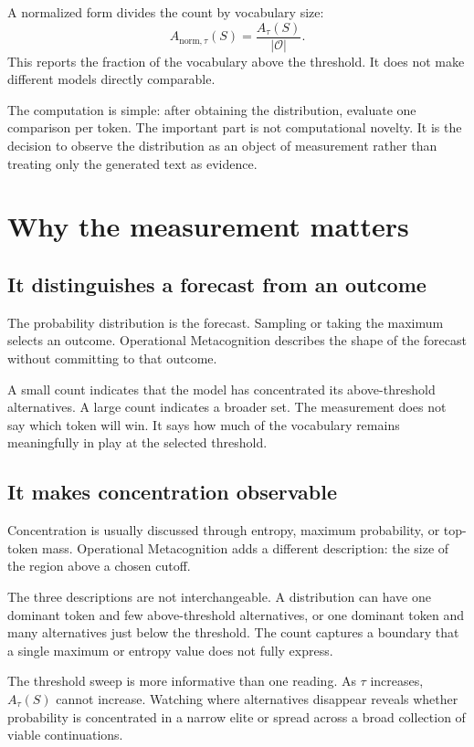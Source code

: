 \documentclass[11pt,a4paper]{article}
\begin{document}
A normalized form divides the count by vocabulary size:
\begin{equation}
A_{\mathrm{norm},\tau}(S)=\frac{A_\tau(S)}{|\mathcal{O}|}.
\end{equation}
This reports the fraction of the vocabulary above the threshold. It does not make different models directly comparable.

The computation is simple: after obtaining the distribution, evaluate one comparison per token. The important part is not computational novelty. It is the decision to observe the distribution as an object of measurement rather than treating only the generated text as evidence.

\section{Why the measurement matters}
\subsection{It distinguishes a forecast from an outcome}
The probability distribution is the forecast. Sampling or taking the maximum selects an outcome. Operational Metacognition describes the shape of the forecast without committing to that outcome.

A small count indicates that the model has concentrated its above-threshold alternatives. A large count indicates a broader set. The measurement does not say which token will win. It says how much of the vocabulary remains meaningfully in play at the selected threshold.

\subsection{It makes concentration observable}
Concentration is usually discussed through entropy, maximum probability, or top-token mass. Operational Metacognition adds a different description: the size of the region above a chosen cutoff.

The three descriptions are not interchangeable. A distribution can have one dominant token and few above-threshold alternatives, or one dominant token and many alternatives just below the threshold. The count captures a boundary that a single maximum or entropy value does not fully express.

The threshold sweep is more informative than one reading. As $\tau$ increases, $A_\tau(S)$ cannot increase. Watching where alternatives disappear reveals whether probability is concentrated in a narrow elite or spread across a broad collection of viable continuations.
\end{document}
